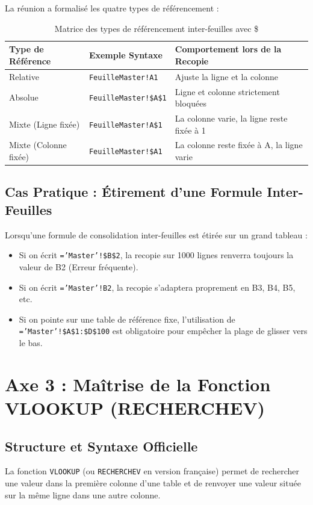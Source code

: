 \documentclass[12pt,a4paper]{article}
\begin{document}
La réunion a formalisé les quatre types de référencement :

\begin{table}[h]
\centering
\begin{tabular}{@{}lll@{}}
\toprule
\textbf{Type de Référence} & \textbf{Exemple Syntaxe} & \textbf{Comportement lors de la Recopie} \\ \midrule
Relative & \texttt{FeuilleMaster!A1} & Ajuste la ligne et la colonne \\
Absolue & \texttt{FeuilleMaster!\$A\$1} & Ligne et colonne strictement bloquées \\
Mixte (Ligne fixée) & \texttt{FeuilleMaster!A\$1} & La colonne varie, la ligne reste fixée à 1 \\
Mixte (Colonne fixée) & \texttt{FeuilleMaster!\$A1} & La colonne reste fixée à A, la ligne varie \\ \bottomrule
\end{tabular}
\caption{Matrice des types de référencement inter-feuilles avec \$}
\end{table}

\subsection{Cas Pratique : Étirement d'une Formule Inter-Feuilles}
Lorsqu'une formule de consolidation inter-feuilles est étirée sur un grand tableau :
\begin{itemize}
    \item Si on écrit \texttt{='Master'!\$B\$2}, la recopie sur 1000 lignes renverra toujours la valeur de B2 (Erreur fréquente).
    \item Si on écrit \texttt{='Master'!B2}, la recopie s'adaptera proprement en B3, B4, B5, etc.
    \item Si on pointe sur une table de référence fixe, l'utilisation de \texttt{='Master'!\$A\$1:\$D\$100} est obligatoire pour empêcher la plage de glisser vers le bas.
\end{itemize}

\section{Axe 3 : Maîtrise de la Fonction VLOOKUP (RECHERCHEV)}

\subsection{Structure et Syntaxe Officielle}
La fonction \texttt{VLOOKUP} (ou \texttt{RECHERCHEV} en version française) permet de rechercher une valeur dans la première colonne d'une table et de renvoyer une valeur située sur la même ligne dans une autre colonne.
\end{document}
